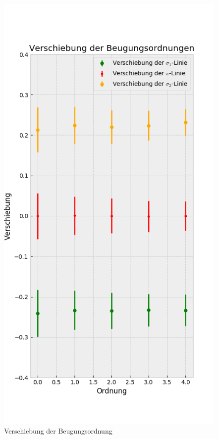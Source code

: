         \begin{landscape}
          \thispagestyle{empty}
          \begin{figure}
            \vspace*{-2cm}
            \caption{Verschiebung der Beugungsordnung}
            \label{plot::3.5}
            \hspace*{-5cm}\vspace{-1cm}
            \includegraphics[width=.45\paperwidth]{Auswertung/scatterorder/diff_sco10A}

\end{figure}
\end{landscape}
